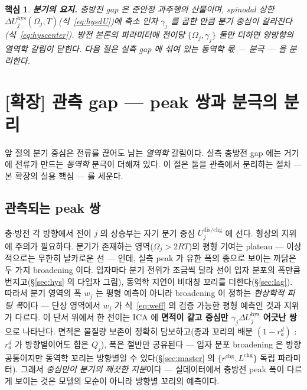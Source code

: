 \documentclass[11pt,a4paper]{article}
\newtheorem*{keybox}{핵심}
\newcommand{\dis}{\mathrm{dis}}
\newcommand{\chg}{\mathrm{chg}}
\newcommand{\hys}{\mathrm{hys}}
\begin{document}
\begin{keybox}
\textbf{분기의 요지.} 충방전 gap 은 준안정 과주행의 산물이며, spinodal 상한
$\Delta U_j^\hys(\Omega_j,T)$(식~\eqref{eq:hysdU})에 축소 인자 $\gamma_j$ 를 곱한 만큼 분기 중심이
갈라진다(식~\eqref{eq:hyscenter}). 방전 본론의 파라미터에 전이당 $\{\Omega_j,\gamma_j\}$ 둘만 더하면
양방향의 \emph{열역학} 갈림이 닫힌다. 다음 절은 실측 gap 에 섞여 있는 \emph{동역학} 몫 — 분극 — 을
분리한다.
\end{keybox}

\section{[확장] 관측 gap — peak 쌍과 분극의 분리}\label{sec:hyspol}
앞 절의 분기 중심은 전류를 끊어도 남는 \emph{열역학} 갈림이다. 실측 충방전 gap 에는 거기에 전류가 만드는
\emph{동역학} 분극이 더해져 있다. 이 절은 둘을 관측에서 분리하는 절차 — 본 확장의 실용 핵심 — 를 세운다.

\subsection{관측되는 peak 쌍}\label{sec:hyspeak}
충$\cdot$방전 각 방향에서 전이 $j$ 의 상승부는 자기 분기 중심 $U_j^{\dis/\chg}$ 에 선다. 형상의 지위에
주의가 필요하다. 분기가 존재하는 영역($\Omega_j>2RT$)의 평형 기여는 plateau — 이상적으로는 무한히 날카로운
선 — 인데, 실측 peak 가 유한 폭의 종으로 보이는 까닭은 두 가지 broadening 이다. 입자마다 분기 전위가
조금씩 달라 선이 입자 분포의 폭만큼 번지고(\S\ref{sec:hys} 의 다입자 그림), 동역학 지연이 비대칭 꼬리를
더한다(\S\ref{sec:lag}). 따라서 분기 영역의 폭 $w_j$ 는 평형 예측이 아니라 broadening 이 정하는
\emph{현상학적 피팅 폭}이다 — 단상 영역에서 $w_j$ 가 식~\eqref{eq:weff} 의 검증 가능한 평형 예측인 것과
지위가 다르다. 이 단서 위에서 한 전이는 ICA 에 \textbf{면적이 같고 중심만 $\gamma_j\Delta U_j^\hys$ 어긋난
쌍}으로 나타난다. 면적은 물질량 보존이 정확히 담보하고(종과 꼬리의 배분 $(1-r_a^d)$ : $r_a^d$ 가 방향별이어도
합은 $Q_j$), 폭은 절반만 공유된다 — 입자 분포 broadening 은 방향 공통이지만 동역학 꼬리는 방향별일 수
있다(\S\ref{sec:master} 의 $\{r^{\chg},L^{\chg}\}$ 독립 파라미터). 그래서 \emph{중심만이 분기의
깨끗한 지문}이다 — 실데이터에서 충방전 peak 폭이 다르게 보이는 것은 모델의 모순이 아니라 방향별
꼬리의 예측이다.
\end{document}
